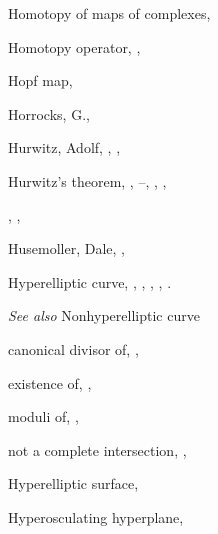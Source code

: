 {{\noindent\hspace*{0.0bp}Homotopy of maps of complexes, \par
\noindent\hspace*{0.0bp}Homotopy operator, , \par
\noindent\hspace*{0.0bp}Hopf map, \par
\noindent\hspace*{0.0bp}Horrocks, G., \par
\noindent\hspace*{0.0bp}Hurwitz, Adolf, , , \par
\noindent\hspace*{0.0bp}Hurwitz's theorem, , --, , ,\par
\noindent\hspace*{15.0bp}, , \par
\noindent\hspace*{0.0bp}Husemoller, Dale, , \par
\noindent\hspace*{0.0bp}Hyperelliptic curve, , , , , .\par
\noindent\hspace*{15.0bp}\emph{See also} Nonhyperelliptic curve\par
\noindent\hspace*{7.5bp}canonical divisor of, , \par
\noindent\hspace*{7.5bp}existence of, , \par
\noindent\hspace*{7.5bp}moduli of, , \par
\noindent\hspace*{7.5bp}not a complete intersection, , \par
\noindent\hspace*{0.0bp}Hyperelliptic surface, \par
\noindent\hspace*{0.0bp}Hyperosculating hyperplane, \par
}}

